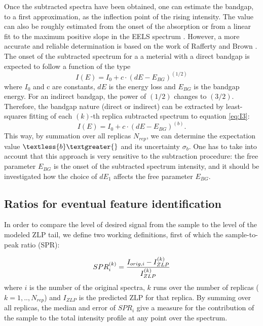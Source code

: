 \documentclass[11pt,a4paper]{article}
\def\frac#1#2{{{#1}\over {#2}}}
\numberwithin{equation}{section}
\numberwithin{figure}{section}
\numberwithin{table}{section}
\begin{document}
Once the subtracted spectra have been obtained, one can estimate the bandgap, to a first approximation, as the inflection point of the rising intensity. The value can also be roughly estimated from the onset of the absorption or from a linear fit to the maximum positive slope in the EELS spectrum \cite{Schamm:2003}. However, a more accurate and reliable determination is based on the work of Rafferty and Brown  \cite{Rafferty:2000}. The onset of the subtracted spectrum for a a meterial with a direct bandgap is expected to follow a function of the type
\begin{equation} 
    I(E) = I_0 + c\cdot(dE-E_{BG})^{(1/2)}
\end{equation}
where $I_0$ and c are constants, $dE$ is the energy loss and $E_{BG}$ is the bandgap energy. For an indirect bandgap, the power of $(1/2)$ changes to $(3/2)$. Therefore, the bandgap nature (direct or indirect) can be extracted by least-squares fitting of each $(k)$-th replica subtracted spectrum to equation \ref{eq:I3}:
\begin{equation} 
    I(E) = I_0 + c\cdot(dE-E_{BG})^{(b)}.
\end{equation}
This way, by summation over all replicas $N_{rep}$, we can determine the expectation value $\textless{b}\textgreater{}$ and its uncertainty $\sigma_b$. One has to take into account that this approach is very sensitive to the subtraction procedure: the free parameter $E_{BG}$ is the onset of the subtracted spectrum intensity, and it should be investigated how the choice of $dE_1$ affects the free parameter $E_{BG}$.

\subsection{Ratios for eventual feature identification}

In order to compare the level of desired signal from the sample to the level of the modeled ZLP tail, we define two working definitions, first of which the sample-to-peak ratio (SPR):

\begin{equation}
    SPR_{i}^{(k)} = \frac{I_{orig, i} - I_{ZLP}^{(k)}}{I_{ZLP}^{(k)}}
\end{equation}
where $i$ is the number of the original spectra, $k$ runs over the number of replicas ($k=1,..,N_{rep}$) and $I_{ZLP}$ is the predicted ZLP for that replica. By summing over all replicas, the median and error of $SPR_i$ give a measure for the contribution of the sample to the total intensity profile at any point over the spectrum. \\
\end{document}
